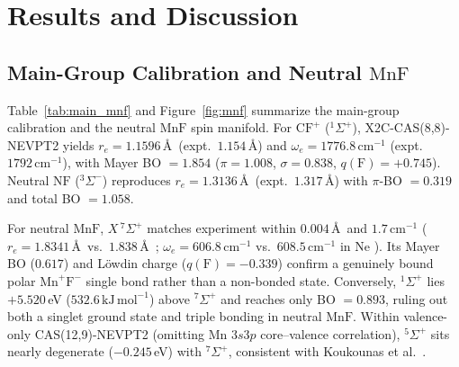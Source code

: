 \documentclass[10pt,twocolumn]{article}
\begin{document}
\section{Results and Discussion}

\subsection{Main-Group Calibration and Neutral $\mathrm{MnF}$}
Table~\ref{tab:main_mnf} and Figure~\ref{fig:mnf} summarize the main-group calibration and the neutral $\mathrm{MnF}$ spin manifold. For $\mathrm{CF}^+$ ($^1\Sigma^+$), X2C-CAS(8,8)-NEVPT2 yields $r_e = 1.1596\,$\AA\ (expt.\ $1.154\,$\AA) and $\omega_e = 1776.8\,\mathrm{cm}^{-1}$ (expt.\ $1792\,\mathrm{cm}^{-1}$), with Mayer BO $= 1.854$ ($\pi = 1.008$, $\sigma = 0.838$, $q(\mathrm{F}) = +0.745$). Neutral $\mathrm{NF}$ ($^3\Sigma^-$) reproduces $r_e = 1.3136\,$\AA\ (expt.\ $1.317\,$\AA) with $\pi$-BO $= 0.319$ and total BO $= 1.058$.

For neutral $\mathrm{MnF}$, $X\,^7\Sigma^+$ matches experiment within $0.004\,$\AA\ and $1.7\,\mathrm{cm}^{-1}$ ($r_e = 1.8341\,$\AA\ vs.\ $1.838\,$\AA\ \cite{sheridan2003}; $\omega_e = 606.8\,\mathrm{cm}^{-1}$ vs.\ $608.5\,\mathrm{cm}^{-1}$ in Ne \cite{brosi2016}). Its Mayer BO ($0.617$) and L\"owdin charge ($q(\mathrm{F}) = -0.339$) confirm a genuinely bound polar $\mathrm{Mn}^+\mathrm{F}^-$ single bond rather than a non-bonded state. Conversely, $^1\Sigma^+$ lies $+5.520\,$eV ($532.6\,\mathrm{kJ\,mol}^{-1}$) above $^7\Sigma^+$ and reaches only BO $= 0.893$, ruling out both a singlet ground state and triple bonding in neutral $\mathrm{MnF}$. Within valence-only CAS(12,9)-NEVPT2 (omitting Mn $3s3p$ core--valence correlation), $^5\Sigma^+$ sits nearly degenerate ($-0.245\,$eV) with $^7\Sigma^+$, consistent with Koukounas et al.\ \cite{koukounas2004}.
\end{document}
